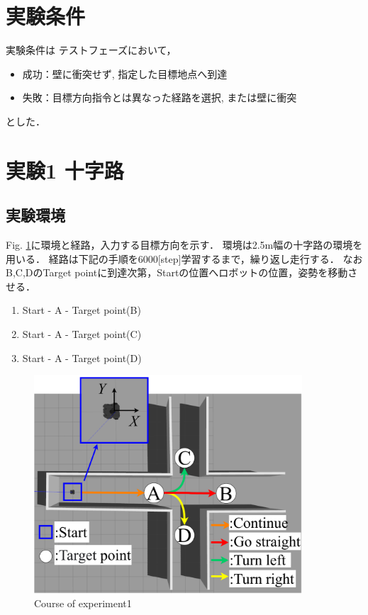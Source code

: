 \section{実験条件}
実験条件は
テストフェーズにおいて，
\begin{itemize}
  \item 成功：壁に衝突せず, 指定した目標地点へ到達
  \item 失敗：目標方向指令とは異なった経路を選択, または壁に衝突
\end{itemize}
とした．
\newpage
\section{実験1 十字路}
\subsection{実験環境}
Fig. \ref{fig::zyuzi}に環境と経路，入力する目標方向を示す．
環境は2.5m幅の十字路の環境を用いる．
経路は下記の手順を6000[step]学習するまで，繰り返し走行する．
なおB,C,DのTarget pointに到達次第，Startの位置へロボットの位置，姿勢を移動させる．
\begin{enumerate}
  \setlength{\parskip}{0cm} %
  \setlength{\itemsep}{0cm} %
  \item Start - A - Target point(B)
  \item Start - A - Target point(C)
  \item Start - A - Target point(D)
  \end{enumerate}

\begin{figure}[ht]
    \centering
    \includegraphics[width = 10cm]{./figs/zyuziroute.pdf}
    \caption{Course of experiment1}
    \label{fig::zyuzi}
\end{figure}

